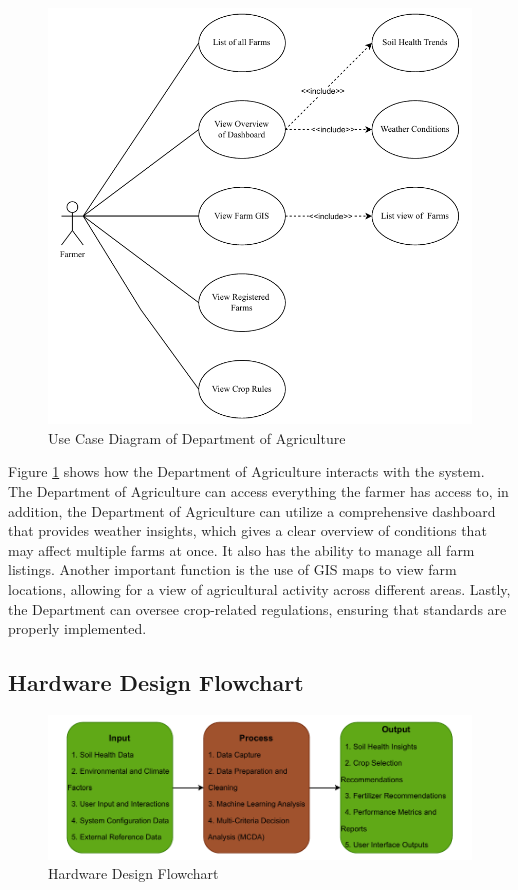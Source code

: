 {	\begin{figure}[H]
		\centering
		\caption{Use Case Diagram of Department of Agriculture}
		\label{fig:DAUseCase}
		\includegraphics[width=1\textwidth]{figures/DAUseCase.pdf}
	\end{figure}
	
	Figure \ref{fig:DAUseCase} shows how the Department of Agriculture interacts with the system. The Department of Agriculture can access everything the farmer has access to, in addition, the Department of Agriculture can utilize a comprehensive dashboard that provides weather insights, which gives a clear overview of conditions that may affect multiple farms at once.  It also has the ability to manage all farm listings. Another important function is the use of GIS maps to view farm locations, allowing for a view of agricultural activity across different areas. Lastly, the Department can oversee crop-related regulations, ensuring that standards are properly implemented.
	
	\subsection{Hardware Design Flowchart}
	\begin{figure}[H]
		\centering
		\caption{Hardware Design Flowchart}
		\label{fig:HardwareFlowchart}
		\includegraphics[width=1\textwidth]{figures/IPO.pdf}
	\end{figure}
	
}
